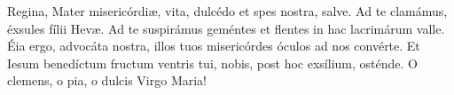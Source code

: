 Regina, Mater misericórdi{\ae}, vita, dulcédo et spes nostra, salve. Ad te clamámus, éxsules fílii Hev{\ae}.
Ad te suspirámus geméntes et flentes in hac lacrimárum valle. Éia ergo, advocáta nostra, illos tuos misericórdes óculos ad nos convérte.
Et Iesum benedíctum fructum ventris tui, nobis, post hoc exsílium, osténde. O clemens, o pia, o dulcis Virgo Maria!

\vspace{2mm}

